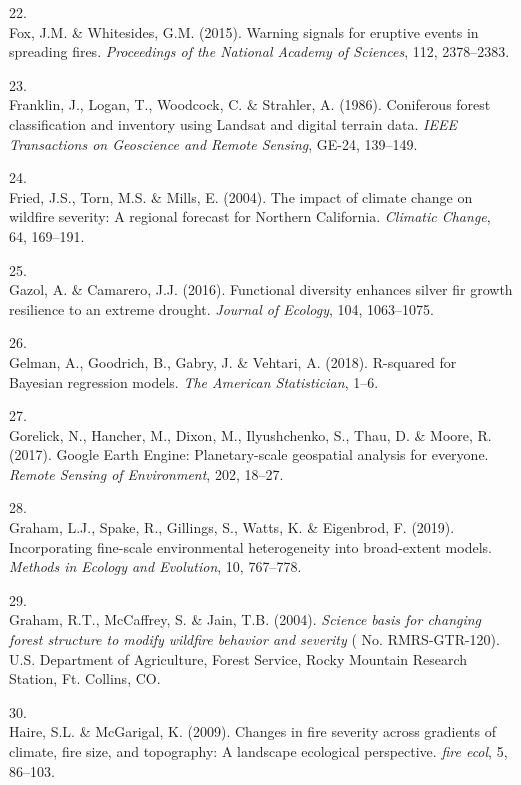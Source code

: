 \documentclass[]{article}
\begin{document}
\leavevmode\hypertarget{ref-fox2015}{}%
22.\\
Fox, J.M. \& Whitesides, G.M. (2015). Warning signals for eruptive
events in spreading fires. \emph{Proceedings of the National Academy of
Sciences}, 112, 2378--2383.

\leavevmode\hypertarget{ref-franklin1986}{}%
23.\\
Franklin, J., Logan, T., Woodcock, C. \& Strahler, A. (1986). Coniferous
forest classification and inventory using Landsat and digital terrain
data. \emph{IEEE Transactions on Geoscience and Remote Sensing}, GE-24,
139--149.

\leavevmode\hypertarget{ref-fried2004}{}%
24.\\
Fried, J.S., Torn, M.S. \& Mills, E. (2004). The impact of climate
change on wildfire severity: A regional forecast for Northern
California. \emph{Climatic Change}, 64, 169--191.

\leavevmode\hypertarget{ref-gazol2016}{}%
25.\\
Gazol, A. \& Camarero, J.J. (2016). Functional diversity enhances silver
fir growth resilience to an extreme drought. \emph{Journal of Ecology},
104, 1063--1075.

\leavevmode\hypertarget{ref-gelman2018}{}%
26.\\
Gelman, A., Goodrich, B., Gabry, J. \& Vehtari, A. (2018). R-squared for
Bayesian regression models. \emph{The American Statistician}, 1--6.

\leavevmode\hypertarget{ref-gorelick2017}{}%
27.\\
Gorelick, N., Hancher, M., Dixon, M., Ilyushchenko, S., Thau, D. \&
Moore, R. (2017). Google Earth Engine: Planetary-scale geospatial
analysis for everyone. \emph{Remote Sensing of Environment}, 202,
18--27.

\leavevmode\hypertarget{ref-graham2019}{}%
28.\\
Graham, L.J., Spake, R., Gillings, S., Watts, K. \& Eigenbrod, F.
(2019). Incorporating fine-scale environmental heterogeneity into
broad-extent models. \emph{Methods in Ecology and Evolution}, 10,
767--778.

\leavevmode\hypertarget{ref-graham2004}{}%
29.\\
Graham, R.T., McCaffrey, S. \& Jain, T.B. (2004). \emph{Science basis
for changing forest structure to modify wildfire behavior and severity}
( No. RMRS-GTR-120). U.S. Department of Agriculture, Forest Service,
Rocky Mountain Research Station, Ft. Collins, CO.

\leavevmode\hypertarget{ref-haire2009}{}%
30.\\
Haire, S.L. \& McGarigal, K. (2009). Changes in fire severity across
gradients of climate, fire size, and topography: A landscape ecological
perspective. \emph{fire ecol}, 5, 86--103.
\end{document}
